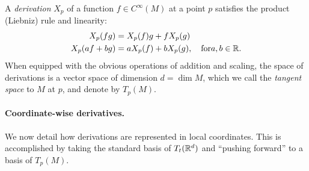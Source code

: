 \documentclass{article}
\begin{document}
	A \emph{derivation} $X_p$ of a function $f \in C^{\infty}(M)$ at a point $p$ satisfies the product (Liebniz) rule and linearity:
	\begin{equation*}
	\begin{aligned}
		X_p(fg) & = X_p(f)g + f X_p(g) \\
		X_p(af + b g) &= a X_p(f) + b X_p(g), \quad {\rm for} a,b \in \mathbb{R}.
	\end{aligned}
	\end{equation*}
	When equipped with the obvious operations of addition and scaling, the space of derivations is a vector space of dimension $d = \dim M$, which we call the \emph{tangent space} to $M$ at $p$, and denote by $T_p(M)$.
	
	\paragraph{Coordinate-wise derivatives.}
	We now detail how derivations are represented in local coordinates. This is accomplished by taking the standard basis of $T_t(\mathbb{R}^d)$ and ``pushing forward'' to a basis of $T_{p}(M)$. 
	
\end{document}
